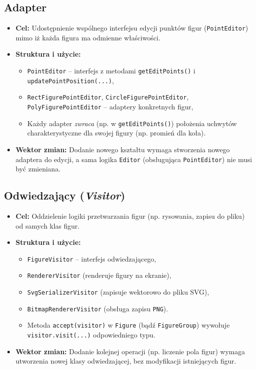 \documentclass[a4paper,12pt]{article}
\begin{document}
\subsection{Adapter}
\begin{itemize}
    \item \textbf{Cel:} Udostępnienie wspólnego interfejsu edycji punktów figur 
    (\texttt{PointEditor}) mimo iż każda figura ma odmienne właściwości.
    \item \textbf{Struktura i użycie:}
    \begin{itemize}
      \item \texttt{PointEditor} -- interfejs z metodami \texttt{getEditPoints()}
      i \texttt{updatePointPosition(...)},
      \item \texttt{RectFigurePointEditor}, \texttt{CircleFigurePointEditor}, 
      \texttt{PolyFigurePointEditor} -- adaptery konkretnych figur,
      \item Każdy adapter \emph{zwraca} (np. w \texttt{getEditPoints()}) położenia uchwytów 
      charakterystyczne dla swojej figury (np. promień dla koła).
    \end{itemize}
    \item \textbf{Wektor zmian:} Dodanie nowego kształtu wymaga stworzenia
    nowego adaptera do edycji, a sama logika \texttt{Editor} (obsługująca \texttt{PointEditor})
    nie musi być zmieniana.
\end{itemize}

\subsection{Odwiedzający (\emph{Visitor})}
\begin{itemize}
    \item \textbf{Cel:} Oddzielenie logiki przetwarzania figur (np. rysowania, 
    zapisu do pliku) od samych klas figur.
    \item \textbf{Struktura i użycie:}
    \begin{itemize}
      \item \texttt{FigureVisitor} -- interfejs odwiedzającego, 
      \item \texttt{RendererVisitor} (renderuje figury na ekranie),
      \item \texttt{SvgSerializerVisitor} (zapisuje wektorowo do pliku SVG),
      \item \texttt{BitmapRendererVisitor} (obsługa zapisu \texttt{PNG}).
      \item Metoda \texttt{accept(visitor)} w \texttt{Figure} (bądź \texttt{FigureGroup})
      wywołuje \texttt{visitor.visit(...)} odpowiedniego typu.
    \end{itemize}
    \item \textbf{Wektor zmian:} Dodanie kolejnej operacji (np. liczenie pola figur)
    wymaga utworzenia nowej klasy odwiedzającej, bez modyfikacji istniejących figur.
\end{itemize}
\end{document}
